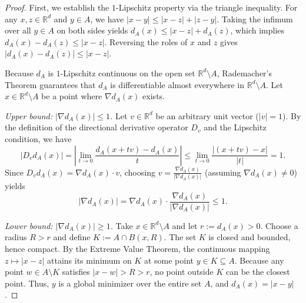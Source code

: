 \documentclass[12pt]{article}
\newcommand{\RR}{\mathbb{R}}
\begin{document}
\begin{proof}
First, we establish the $1$-Lipschitz property via the triangle inequality. For any
$x, z \in \RR^d$ and $y \in A$, we have $|x - y| \leq |x - z| + |z - y|$. Taking the infimum over
all $y \in A$ on both sides yields $d_A(x) \leq |x - z| + d_A(z)$, which implies
$d_A(x) - d_A(z) \leq |x - z|$. Reversing the roles of $x$ and $z$ gives
$|d_A(x) - d_A(z)| \leq |x - z|$.

Because $d_A$ is $1$-Lipschitz continuous on the open set $\RR^d \setminus A$, Rademacher's
Theorem guarantees that $d_A$ is differentiable almost everywhere in $\RR^d \setminus A$. Let
$x \in \RR^d \setminus A$ be a point where $\nabla d_A(x)$ exists.

\emph{Upper bound: $|\nabla d_A(x)| \leq 1$.}
Let $v \in \RR^d$ be an arbitrary unit vector ($|v| = 1$). By the definition of the directional
derivative operator $D_v$ and the Lipschitz condition, we have
\begin{equation*}
|D_v d_A(x)| = \left| \lim_{t \to 0} \frac{d_A(x + tv) - d_A(x)}{t} \right| \leq \lim_{t \to 0} \frac{|(x+tv) - x|}{|t|} = 1.
\end{equation*}
Since $D_v d_A(x) = \nabla d_A(x) \cdot v$, choosing $v = \frac{\nabla d_A(x)}{|\nabla d_A(x)|}$
(assuming $\nabla d_A(x) \neq 0$) yields
\begin{equation*}
|\nabla d_A(x)| = \nabla d_A(x) \cdot \frac{\nabla d_A(x)}{|\nabla d_A(x)|} \leq 1.
\end{equation*}

\emph{Lower bound: $|\nabla d_A(x)| \geq 1$.} Take $x \in \mathbb R^d \setminus A$ and let $r := d_A(x) > 0$. Choose a radius $R > r$ and define $K := A \cap B(x, R)$. The set $K$ is closed and bounded, hence compact. By the Extreme Value Theorem, the
continuous mapping $z \mapsto |x - z|$ attains its minimum on $K$ at some point $y \in K \subseteq A$.
Because any point $w \in A \setminus K$ satisfies $|x - w| > R > r$, no point outside $K$
can be the closest point. Thus, $y$ is a global minimizer over the entire set $A$, and
$d_A(x) = |x - y|$.


\end{proof}
\end{document}
